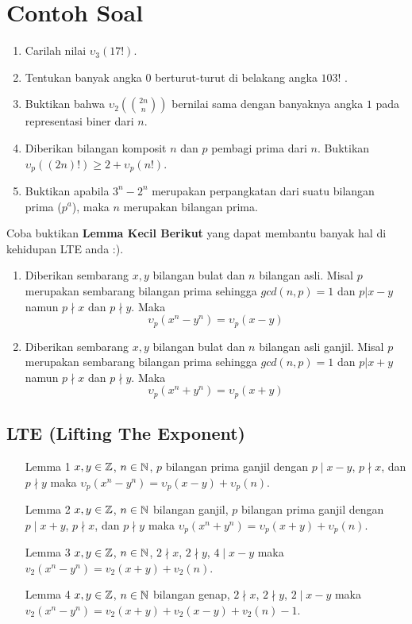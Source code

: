 \documentclass[11pt]{scrartcl}
\begin{document}
\section{Contoh Soal}
\begin{enumerate}
    \item Carilah nilai $\upsilon_3(17!)$.
    \item Tentukan banyak angka 0 berturut-turut di belakang angka $103!$ .
    \item Buktikan bahwa $\upsilon_2(\binom{2n}{n})$ bernilai sama dengan banyaknya angka $1$ pada representasi biner dari $n$.
    \item Diberikan bilangan komposit $n$ dan $p$ pembagi prima dari $n$. Buktikan $\upsilon_p((2n)!) \geq 2+\upsilon_p(n!)$.
    \item Buktikan apabila $3^n-2^n$ merupakan perpangkatan dari suatu bilangan prima ($p^a$), maka $n$ merupakan bilangan prima.
\end{enumerate}

Coba buktikan \textbf{Lemma Kecil Berikut} yang dapat membantu banyak hal di kehidupan LTE anda :).

\begin{enumerate}[resume]
    \item Diberikan sembarang $x,y$ bilangan bulat dan $n$ bilangan asli. Misal $p$ merupakan sembarang bilangan prima sehingga $gcd(n,p)=1$ dan $p|x-y$ namun $p\nmid x$ dan $p\nmid y$. Maka
    \[\upsilon_p(x^n-y^n) = \upsilon_p(x-y)\]
    \item Diberikan sembarang $x,y$ bilangan bulat dan $n$ bilangan asli ganjil. Misal $p$ merupakan sembarang bilangan prima sehingga $gcd(n,p)=1$ dan $p|x+y$ namun $p\nmid x$ dan $p\nmid y$. Maka
    \[\upsilon_p(x^n+y^n) = \upsilon_p(x+y)\]
\end{enumerate}

\subsection{LTE (Lifting The Exponent)}
\begin{enumerate}
    \item [Lemma 1] $x,y \in \mathbb Z$, $n \in \mathbb N$, $p$ bilangan prima ganjil dengan $p \mid x-y$, $p \nmid x$, dan $p \nmid y$ maka $\upsilon_p(x^n-y^n)=\upsilon_p(x-y)+\upsilon_p(n)$.
    \item [Lemma 2] $x,y \in \mathbb Z$, $n \in \mathbb N$ bilangan ganjil, $p$ bilangan prima ganjil dengan $p \mid x+y$, $p \nmid x$, dan $p \nmid y$ maka $\upsilon_p(x^n+y^n)=\upsilon_p(x+y)+\upsilon_p(n)$.
    \item [Lemma 3] $x,y \in \mathbb Z$, $n \in \mathbb N$, $2 \nmid x$, $2 \nmid y$,  $4 \mid x-y$  maka $v_2(x^n-y^n)=v_2(x+y)+v_2(n)$.
    \item [Lemma 4] $x,y \in \mathbb Z$, $n \in \mathbb N$ bilangan genap, $2 \nmid x$, $2 \nmid y$,  $2 \mid x-y$ maka $v_2(x^n-y^n)=v_2(x+y)+v_2(x-y)+v_2(n)-1$.
\end{enumerate}
\end{document}
